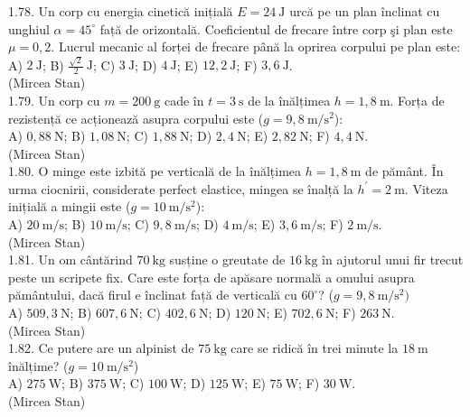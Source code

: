 1.78. Un corp cu energia cinetică inițială $E=24 \mathrm{~J}$ urcă pe un plan înclinat cu unghiul $\alpha=45^{\circ}$ față de orizontală. Coeficientul de frecare între corp şi plan este $\mu=0,2$. Lucrul mecanic al forței de frecare până la oprirea corpului pe plan este:\\ A) $2 \mathrm{~J}$; B) $\frac{\sqrt{2}}{2} \mathrm{~J}$; C) $3 \mathrm{~J}$; D) $4 \mathrm{~J}$; E) $12,2 \mathrm{~J}$; F) $3,6 \mathrm{~J}$.\\ (Mircea Stan)\\

1.79. Un corp cu $m=200 \mathrm{~g}$ cade în $t=3 \mathrm{~s}$ de la înălțimea $h=1,8 \mathrm{~m}$. Forța de rezistență ce acționează asupra corpului este ($g=9,8 \mathrm{~m} / \mathrm{s}^{2}$):\\ A) $0,88 \mathrm{~N}$; B) $1,08 \mathrm{~N}$; C) $1,88 \mathrm{~N}$; D) $2,4 \mathrm{~N}$; E) $2,82 \mathrm{~N}$; F) $4,4 \mathrm{~N}$.\\ (Mircea Stan)\\

1.80. O minge este izbită pe verticală de la înălțimea $h=1,8 \mathrm{~m}$ de pământ. În urma ciocnirii, considerate perfect elastice, mingea se înalță la $h^{\prime}=2 \mathrm{~m}$. Viteza inițială a mingii este ($g=10 \mathrm{~m} / \mathrm{s}^{2}$):\\ A) $20 \mathrm{~m} / \mathrm{s}$; B) $10 \mathrm{~m} / \mathrm{s}$; C) $9,8 \mathrm{~m} / \mathrm{s}$; D) $4 \mathrm{~m} / \mathrm{s}$; E) $3,6 \mathrm{~m} / \mathrm{s}$; F) $2 \mathrm{~m} / \mathrm{s}$.\\ (Mircea Stan)\\

1.81. Un om cântărind $70 \mathrm{~kg}$ susține o greutate de $16 \mathrm{~kg}$ în ajutorul unui fir trecut peste un scripete fix. Care este forța de apăsare normală a omului asupra pământului, dacă firul e înclinat față de verticală cu $60^{\circ}$? ($g=9,8 \mathrm{~m} / \mathrm{s}^{2})$\\ A) $509,3 \mathrm{~N}$; B) $607,6 \mathrm{~N}$; C) $402,6 \mathrm{~N}$; D) $120 \mathrm{~N}$; E) $702,6 \mathrm{~N}$; F) $263 \mathrm{~N}$.\\ (Mircea Stan)\\

1.82. Ce putere are un alpinist de $75 \mathrm{~kg}$ care se ridică în trei minute la $18 \mathrm{~m}$ înălțime? ($g=10 \mathrm{~m} / \mathrm{s}^{2}$)\\ A) $275 \mathrm{~W}$; B) $375 \mathrm{~W}$; C) $100 \mathrm{~W}$; D) $125 \mathrm{~W}$; E) $75 \mathrm{~W}$; F) $30 \mathrm{~W}$.\\ (Mircea Stan)\\

